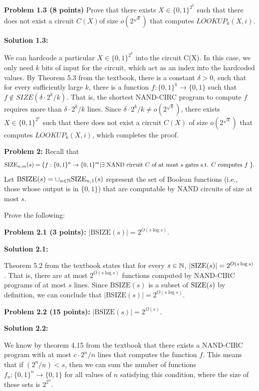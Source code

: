 \documentclass[11pt]{article}
\begin{document}
\textbf{Problem 1.3 (8 points)} Prove that there exists $X \in \{0,1\}^{2^k}$ such that there does not exist a circuit $C(X)$\footnotemark[1] of size $o(2^{\sqrt k})$ that computes $LOOKUP_k(X,i)$.

\textbf{Solution 1.3:}%

We can hardcode a particular $X \in \{0,1\}^{2^k}$ into the circuit C(X). In this case, we only need $k$ bits of input for the circuit, which act as an index into the hardcoded values. By Theorem 5.3 from the textbook, there is a constant
$\delta > 0$, such that for every sufficiently large $k$, there is a function
$f: \{0, 1\}^k \to \{0, 1\}$ such that $f \notin SIZE(\delta \cdot 2^k / k)$. That is, the shortest NAND-CIRC program to compute $f$ requires more than $\delta \cdot 2^k / k $ lines. Since $\delta \cdot 2^k / k \neq o(2^{\sqrt k})$, there exists $X \in \{0,1\}^{2^k}$ such that there does not exist a circuit $C(X)$ of size $o(2^{\sqrt k})$ that computes $LOOKUP_k(X,i)$, which completes the proof.

\newpage

\newcommand{\BSize}{\mathrm{BSIZE}}

\textbf{Problem 2:}
Recall that 
$$\mathrm{SIZE}_{n,m}(s) = \{f:\{0,1\}^n \to \{0,1\}^m | \exists \mbox{ NAND circuit $C$ of at most $s$ gates s.t. $C$ computes $f$ }\}.$$ 
Let $\BSize(s) = \cup_{n \in \N}  \Size_{n,1}(s)$ represent the set of Boolean functions (i.e., those whose output is in $\{0,1\}$) that are computable by NAND circuits of size at most $s$.

Prove the following:

\textbf{Problem 2.1 (3 points):} $|\BSize(s)| =  2^{O(s \log s)}$. 

\textbf{Solution 2.1:}%

Theorem 5.2 from the textbook states that for every $s \in \mathbb{N}$, $|\mathrm{SIZE}(s)| =  2^{O(s \log s)}$. That is, there are at most $2^{O(s \log s)}$ functions computed by NAND-CIRC programs of at most $s$ lines. Since $\BSize(s)$ is a subset of $\mathrm{SIZE}(s)$ by definition, we can conclude that $|\BSize(s)| =  2^{O(s \log s)}$.


\textbf{Problem 2.2 (15 points):} $|\BSize(s)| = 2^{\Omega(s)}$.

\textbf{Solution 2.2:}%

We know by theorem 4.15 from the textbook that there exists a NAND-CIRC program with at most $c \cdot 2^n / n$ lines that computes the function $f$. This means that if $(2^n / n) < s$, then we can sum the number of functions $f_n: \{0, 1\}^n \to \{0, 1\}$ for all values of $n$ satisfying this condition, where the size of these sets is $2^{2^n}$.
\end{document}
